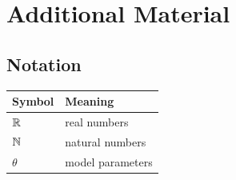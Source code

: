 \chapter{Additional Material}\label{app:extra}

\section{Notation}
\begin{tabular}{ll}
  \toprule
  Symbol & Meaning \\
  \midrule
  $\mathbb{R}$ & real numbers \\
  $\mathbb{N}$ & natural numbers \\
  $\theta$ & model parameters \\
  \bottomrule
\end{tabular}
